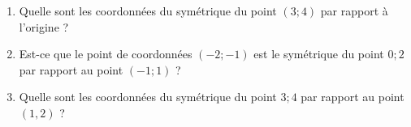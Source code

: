 
\begin{exercice}\label{exosmath-0476}

    \begin{enumerate}
        \item
            Quelle sont les coordonnées du symétrique du point \( (3;4)\) par rapport à l'origine ?
        \item
            Est-ce que le point de coordonnées \( (-2;-1)\) est le symétrique du point \( 0;2\) par rapport au point \( (-1;1)\) ?
        \item
            Quelle sont les coordonnées du symétrique du point \( 3;4\) par rapport au point \( (1,2)\) ?
    \end{enumerate}
     
\end{exercice}

